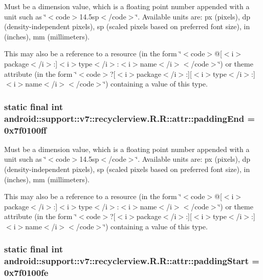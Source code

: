 Must be a dimension value, which is a floating point number appended with a unit such as \char`\"{}$<$code$>$14.5sp$<$/code$>$\char`\"{}. Available units are: px (pixels), dp (density-independent pixels), sp (scaled pixels based on preferred font size), in (inches), mm (millimeters). 

This may also be a reference to a resource (in the form \char`\"{}$<$code$>$@\mbox{[}$<$i$>$package$<$/i$>$:\mbox{]}$<$i$>$type$<$/i$>$:$<$i$>$name$<$/i$>$$<$/code$>$\char`\"{}) or theme attribute (in the form \char`\"{}$<$code$>$?\mbox{[}$<$i$>$package$<$/i$>$:\mbox{]}\mbox{[}$<$i$>$type$<$/i$>$:\mbox{]}$<$i$>$name$<$/i$>$$<$/code$>$\char`\"{}) containing a value of this type. \hypertarget{classandroid_1_1support_1_1v7_1_1recyclerview_1_1_r_1_1attr_8f5148053b1a9883f9fe4739ecc740ea}{
\subsubsection[{paddingEnd}]{\setlength{\rightskip}{0pt plus 5cm}static final int android::support::v7::recyclerview.R.R::attr::paddingEnd = 0x7f0100ff}}
\label{classandroid_1_1support_1_1v7_1_1recyclerview_1_1_r_1_1attr_8f5148053b1a9883f9fe4739ecc740ea}


Must be a dimension value, which is a floating point number appended with a unit such as \char`\"{}$<$code$>$14.5sp$<$/code$>$\char`\"{}. Available units are: px (pixels), dp (density-independent pixels), sp (scaled pixels based on preferred font size), in (inches), mm (millimeters). 

This may also be a reference to a resource (in the form \char`\"{}$<$code$>$@\mbox{[}$<$i$>$package$<$/i$>$:\mbox{]}$<$i$>$type$<$/i$>$:$<$i$>$name$<$/i$>$$<$/code$>$\char`\"{}) or theme attribute (in the form \char`\"{}$<$code$>$?\mbox{[}$<$i$>$package$<$/i$>$:\mbox{]}\mbox{[}$<$i$>$type$<$/i$>$:\mbox{]}$<$i$>$name$<$/i$>$$<$/code$>$\char`\"{}) containing a value of this type. \hypertarget{classandroid_1_1support_1_1v7_1_1recyclerview_1_1_r_1_1attr_76739a635559718c2f66b00a6ca234ff}{
\subsubsection[{paddingStart}]{\setlength{\rightskip}{0pt plus 5cm}static final int android::support::v7::recyclerview.R.R::attr::paddingStart = 0x7f0100fe}}
\label{classandroid_1_1support_1_1v7_1_1recyclerview_1_1_r_1_1attr_76739a635559718c2f66b00a6ca234ff}


